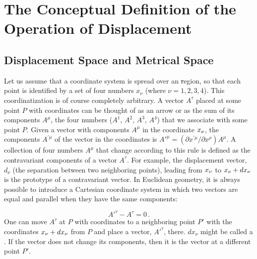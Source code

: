\documentclass[final]{article}
\begin{document}
\section{The Conceptual Definition of the Operation of Displacement}

\subsection{Displacement Space and Metrical Space}

Let us assume that a coordinate system is spread over an \st region, so that each point is identified by a set of four numbers $x_\nu$ (where $\nu=1, 2, 3, 4$). This coordinatization is of course completely arbitrary. A vector $A^\tau$ placed at some point $P$ with coordinates \xn can be thought of as an arrow or as the sum of its components $A^\mu$, the four numbers ($A^1$, $A^2$, $A^3$, $A^4$) that we associate with some point $P$. Given a vector with components $A^{\mu}$ in the coordinate $x_{\nu}$, the components $A^{\prime \mu}$ of the vector in the coordinates \xnpr is $A'^{\mu}=\left(\partial x^{\prime \mu} / \partial x^{\rho}\right) A^{\mu}$. A collection of four numbers $A^\mu$ that change according to this rule is defined as the contravariant components of a vector $A^\tau$. For example, the displacement vector, $d_\nu$ (the separation between two neighboring points), leading from $x_{\nu}$ to $x_{\nu} + dx_{\nu}$ is the prototype of a contravariant vector. In Euclidean geometry, it is always possible to introduce a Cartesian coordinate system in which two vectors are equal and parallel when they have the same components:

\begin{equation}\label{eq:samness}
A'^\tau-A^\tau=0\,.
\end{equation}
%
One can move $A^\tau$ at $P$ with coordinates \xn to a neighboring point $P'$ with the coordinates $x_{\nu}+dx_\nu$ from $P$ and place a vector, $A'^{\tau}$, there. $dx_\nu$ might be called a . If the vector does not change its components, then it is the  vector at a different point $P'$. 
\end{document}
